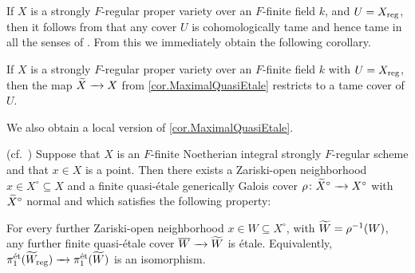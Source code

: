 \documentclass[12pt]{amsart}
\numberwithin{equation}{theorem}
\renewcommand{\:}{\colon}
\newcommand{\piet}{\pi_1^{\textnormal{\'{e}t}}} %
\theoremstyle{theorem}
\def\todo#1{\textcolor{Mahogany}%
{\footnotesize\newline{\color{Mahogany}\fbox{\parbox{\textwidth-15pt}{\textbf{todo:
} #1}}}\newline}}
\begin{document}

If $X$ is a strongly $F$-regular proper variety over an $F$-finite field $k$, and $U = X_{\operatorname{{reg}}}$, then it follows from \cite[Theorem 7.6]{SchwedeTuckerTestIdealFiniteMaps} that any \etale{} cover $U$ is cohomologically tame and hence tame in all the senses of \cite{KerzSchmidtOnDifferentNotionsOfTameness}.
From this we immediately obtain the following corollary.

\begin{corollary} \label{cor.MaximalTameCover}
If $X$ is a strongly $F$-regular proper variety over an $F$-finite field $k$ with $U = X_{\operatorname{{reg}}}$, then the map $\widetilde X \xrightarrow{\ \ } X$ from \autoref{cor.MaximalQuasiEtale} restricts to a tame \etale{} cover of $U$.
\end{corollary}

We also obtain a local version of \autoref{cor.MaximalQuasiEtale}.

\begin{corollary} \textnormal{(cf.~\cite[Theorem 1.9]{GrebKebekusPeternellEtaleFundamental})} \label{cor.LocalMaximalQuasiEtale}
Suppose that $X$ is an $F$-finite Noetherian integral strongly $F$-regular scheme and that $x \in X$ is a point.
Then there exists a Zariski-open neighborhood $x \in X^\circ \subseteq X$ and a finite quasi-\'etale generically Galois cover $\rho\colon \widetilde X^\circ \xrightarrow{\ \ } X^\circ$ with $\widetilde X^\circ$ normal and which satisfies the following property:

For every further Zariski-open neighborhood $x \in W \subseteq X^\circ$, with $\widetilde W = \rho^{-1}(W)$, any further finite quasi-\'etale cover $\overline{W} \xrightarrow{\ \ } \widetilde W$ is \'etale.
Equivalently, $\piet(\tld W_{\reg}) \to \piet(\tld W)$ is an isomorphism.
\end{corollary}
\end{document}
